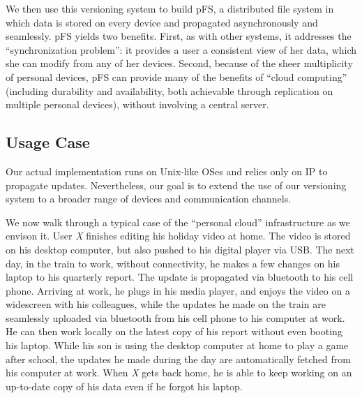 We then use this versioning system to build pFS, a distributed file
system in which data is stored on every device and propagated
asynchronously and seamlessly. pFS yields two benefits. First, as with
other systems, it addresses the ``synchronization problem'': it provides
a user a consistent view of her data, which she can modify from any of her
devices. Second, because of the sheer multiplicity of personal devices,
pFS can provide many of the benefits of ``cloud computing'' (including
durability and availability, both achievable through replication on
multiple personal devices),  without involving a central server. 

%

\subsection{Usage Case}

Our actual implementation runs on Unix-like OSes and relies only on IP
to propagate updates. Nevertheless, our goal is to extend the use of
our versioning system to a broader range of devices and communication
channels.
\fi

\fi

We now walk through a typical 
case of the ``personal cloud'' infrastructure as we envison it. User
\emph{X} finishes editing his holiday video at home. The video is
stored on his desktop computer, but also pushed to his digital player
via USB\@. The next day, in the train to work, without connectivity, he
makes a few changes on his laptop to his quarterly report. The update
is propagated via bluetooth to his cell phone. Arriving at work, he
plugs in his media player, and enjoys the video on a widescreen with
his colleagues, while the updates he made on the train are seamlessly
uploaded via bluetooth from his cell phone to his computer at work. He
can then work locally on the latest copy of his report without even
booting his laptop. While his son is using the desktop computer at
home to play a game after school, the updates he made during the day
are automatically fetched from his computer at work. When \emph{X}
gets back home, he is able to keep working on an up-to-date copy of
his data even if he forgot his laptop. 


